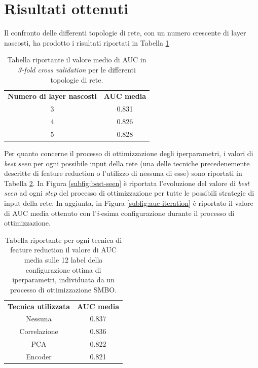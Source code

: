 \section{Risultati ottenuti}
Il confronto delle differenti topologie di rete, con un numero crescente di layer nascosti, ha prodotto i risultati riportati in Tabella \ref{tab:topology}
\begin{table}
	\centering
	\caption{Tabella riportante il valore medio di AUC in \textit{3-fold cross validation} per le differenti topologie di rete.}
	\begin{tabular}{c|c}
		\label{tab:topology}
		\textbf{Numero di layer nascosti} & \textbf{AUC media} \\
		3 & 0.831 \\ 
		4 & 0.826 \\ 
		5 & 0.828 \\
	\end{tabular}
\end{table}
Per quanto concerne il processo di ottimizzazione degli iperparametri, i valori di \textit{best seen} per ogni possibile input della rete (una delle tecniche precedenemente descritte di feature reduction o l'utilizzo di nessuna di esse) sono riportati in Tabella \ref{tab:bestseen}. 
In Figura \ref{subfig:best-seen} è riportata l'evoluzione del valore di \textit{best seen} ad ogni \textit{step} del processo di ottimizzazione per tutte le possibili strategie di input della rete.
In aggiunta, in Figura \ref{subfig:auc-iteration} è riportato il valore di AUC media ottenuto con l'\textit{i}-esima configurazione durante il processo di ottimizzazione.

\begin{table}
	\centering
	\caption{Tabella riportante per ogni tecnica di feature reduction il valore di AUC media sulle 12 label della configurazione ottima di iperparametri, individuata da un processo di ottimizzazione SMBO.}
	\begin{tabular}{c|c}
		\label{tab:bestseen}
		\textbf{Tecnica utilizzata} & \textbf{AUC media} \\
		Nessuna & 0.837 \\ 
		Correlazione & 0.836 \\ 
		PCA & 0.822 \\ 
		Encoder & 0.821 \\ 
	\end{tabular}
\end{table}

